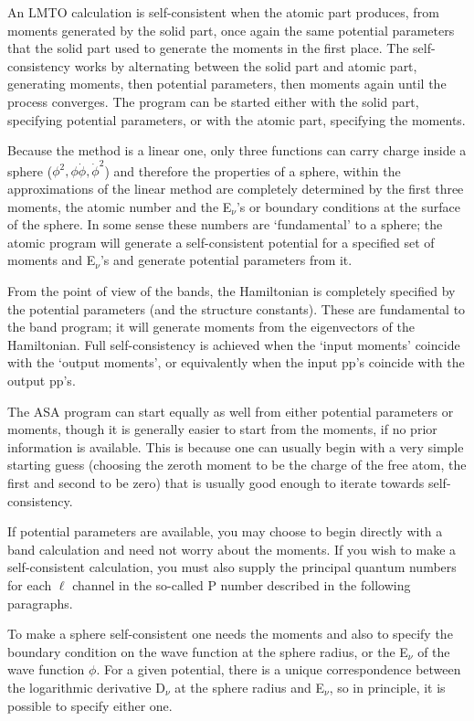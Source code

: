 \documentclass[aps,twocolumn,a4]{revtex4}
\begin{document}
An LMTO calculation is self-consistent when the atomic part produces,
from moments generated by the solid part, once again the same potential
parameters that the solid part used to generate the moments in the first
place.  The self-consistency works by alternating between the solid part
and atomic part, generating moments, then potential parameters, then
moments again until the process converges.  The program can be started
either with the solid part, specifying potential parameters, or with the
atomic part, specifying the moments.

Because the method is a linear one, only three functions can carry
charge inside a sphere ($\phi ^2, \phi \dot \phi, \dot \phi ^2$) and
therefore the properties of a sphere, within the approximations of the
linear method are completely determined by the first three moments, the
atomic number and the E$_\nu $'s or boundary conditions at the surface
of the sphere.  In some sense these numbers are `fundamental' to a
sphere; the atomic program will generate a self-consistent potential for
a specified set of moments and E$_\nu $'s and generate potential
parameters from it.

From the point of view of the bands, the Hamiltonian is completely
specified by the potential parameters (and the structure constants).
These are fundamental to the band program; it will generate moments from
the eigenvectors of the Hamiltonian.  Full self-consistency is achieved
when the `input moments' coincide with the `output moments', or
equivalently when the input pp's coincide with the output pp's.

The ASA program can start equally as well from either potential
parameters or moments, though it is generally easier to start from the
moments, if no prior information is available.  This is because one can
usually begin with a very simple starting guess (choosing the zeroth
moment to be the charge of the free atom, the first and second to be
zero) that is usually good enough to iterate towards self-consistency.

If potential parameters are available, you may choose to
begin directly with a band calculation and need not worry about the
moments. If you wish to make a self-consistent
calculation, you must also supply the principal quantum numbers for each
$\ell $ channel in the so-called P number described in the following
paragraphs.

To make a sphere self-consistent one needs the moments and also to
specify the boundary condition on the wave function at the sphere
radius, or the E$_\nu $ of the wave function $\phi $.  For a given
potential, there is a unique correspondence between the logarithmic
derivative D$_\nu $ at the sphere radius and E$_\nu $, so in
principle, it is possible to specify either one.
\end{document}
